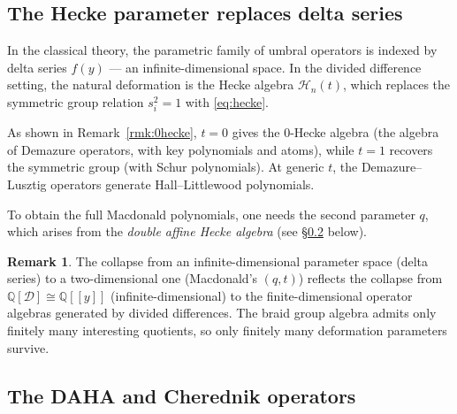 \documentclass[11pt]{amsart}
\theoremstyle{definition}
\newtheorem{remark}[theorem]{Remark}
\newcommand{\Q}{\mathbb{Q}}
\newcommand{\cD}{\mathcal{D}}
\newcommand{\cH}{\mathcal{H}}
\begin{document}
\subsection{The Hecke parameter replaces delta series}

In the classical theory, the parametric family of umbral operators
is indexed by delta series $f(y)$ --- an infinite-dimensional space.
In the divided difference setting, the natural deformation is the
Hecke algebra $\cH_n(t)$, which replaces the symmetric group
relation $s_i^2 = 1$ with \eqref{eq:hecke}.

As shown in Remark~\ref{rmk:0hecke}, $t = 0$ gives the 0-Hecke
algebra (the algebra of Demazure operators, with key polynomials
and atoms), while $t = 1$ recovers the symmetric group (with Schur
polynomials). At generic $t$, the Demazure--Lusztig operators
generate Hall--Littlewood polynomials.

To obtain the full Macdonald polynomials, one needs the second
parameter $q$, which arises from the \emph{double affine Hecke
algebra} (see \S\ref{sec:DAHA} below).

\begin{remark}
  The collapse from an infinite-dimensional parameter space (delta
  series) to a two-dimensional one (Macdonald's $(q,t)$) reflects
  the collapse from $\Q[\cD] \cong \Q[[y]]$
  (infinite-dimensional) to the finite-dimensional operator
  algebras generated by divided differences. The braid group
  algebra admits only finitely many interesting quotients, so only
  finitely many deformation parameters survive.
\end{remark}

\subsection{The DAHA and Cherednik operators}\label{sec:DAHA}
\end{document}
